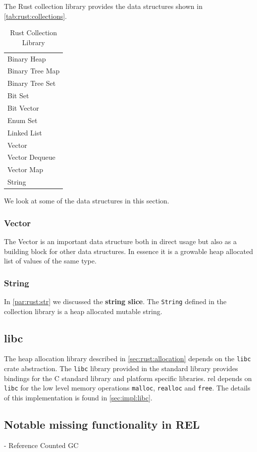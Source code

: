 The Rust collection library provides the data structures shown in \autoref{tab:rust:collections}.

\begin{table}[H]
  \begin{tabular}{l}
    Binary Heap \\
    Binary Tree Map \\
    Binary Tree Set \\
    Bit Set \\
    Bit Vector \\
    Enum Set \\
    Linked List \\
    Vector \\
    Vector Dequeue \\
    Vector Map \\
    String \\
  \end{tabular}
  \caption{Rust Collection Library}
  \label{tab:rust:collections}
\end{table}

We look at some of the data structures in this section.

\subsubsection{Vector}

The Vector is an important data structure both in direct usage but also as a building block for other data structures.
In essence it is a growable heap allocated list of values of the same type.

\subsubsection{String}

In \autoref{par:rust:str} we discussed the \textbf{string slice}.
The \texttt{String} defined in the collection library is a heap allocated mutable string.

\subsection{libc}

The heap allocation library described in \autoref{sec:rust:allocation} depends on the \texttt{libc} crate abstraction.
The \texttt{libc} library provided in the standard library provides bindings for the C standard library and platform specific libraries.
\gls{rel} depends on \texttt{libc} for the low level memory operations \texttt{malloc}, \texttt{realloc} and \texttt{free}.
The details of this implementation is found in \autoref{sec:impl:libc}. 

\subsection{Notable missing functionality in REL}

- Reference Counted GC

